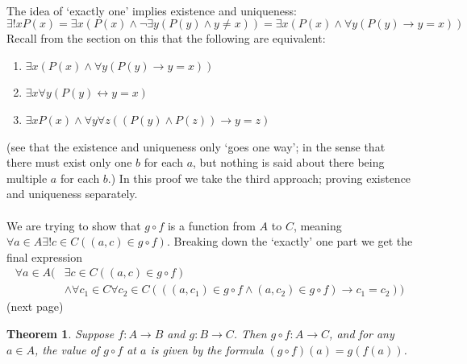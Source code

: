 \documentclass{report}
\newtheorem*{theorem}{Theorem}
\theoremstyle{definition}
\begin{document}
\vspace{1mm}\\
The idea of `exactly one' implies existence and uniqueness:
\begin{equation*}
\exists!xP(x)=\exists x(P(x)\land\neg\exists y(P(y)\land y\neq x))=\exists x(P(x)\land\forall y(P(y)\to y=x))
\end{equation*}
Recall from the section on this that the following are equivalent:
\begin{enumerate}
\item$\exists x(P(x)\land\forall y(P(y)\to y=x))$
\item$\exists x\forall y(P(y)\leftrightarrow y=x)$
\item$\exists xP(x)\land\forall y\forall z((P(y)\land P(z))\to y=z)$ 
\end{enumerate}
(see that the existence and uniqueness only `goes one way'; in the sense that there must exist only one $b$ for each $a$, but nothing is said about there being multiple $a$ for each $b$.)
In this proof we take the third approach; proving existence and uniqueness separately.\\
\vspace{1mm}\\
We are trying to show that $g\circ f$ is a function from $A$ to $C$, meaning 
$\forall a\in A\exists!c\in C((a,c)\in g\circ f)$. Breaking down the `exactly' one part we get the final expression
\begin{align*}
\forall a\in A(&\exists c\in C((a,c)\in g\circ f)\\&\land\forall c_1\in C\forall c_2\in C(((a,c_1)\in g\circ f\land(a,c_2)\in g\circ f)\to c_1=c_2))
\end{align*}
(next page)\newpage
\begin{theorem}
Suppose $f:A\to B$ and $g:B\to C$. Then $g\circ f:A\to C$, and for any $a\in A$, the value of $g\circ f$ at $a$ is given by the formula $(g\circ f)(a)=g(f(a))$. 
\end{theorem}
\end{document}
